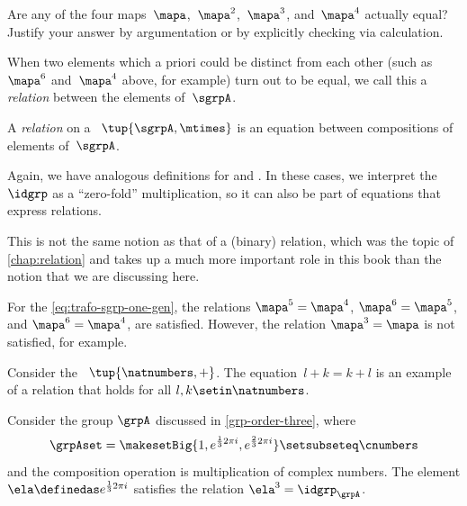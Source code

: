 \begin{gradedexercise}
    \label{ex:CheckRelations}
    Are any of the four maps~$\mapa$,~$\mapa^2$,~$\mapa^3$, and~$\mapa^4$ actually equal?
    Justify your answer by argumentation or by explicitly checking via calculation.
\end{gradedexercise}

When two elements which a priori could be distinct from each other (such as~$\mapa^6$ and~$\mapa^4$ above, for example) turn out to be equal, we call this a \emph{relation} between the elements of~$\sgrpA$.

\begin{ctdefinition}\label{def:relation-on-semigroup}
    A \emph{relation} on a ~$\tup{\sgrpA, \mtimes}$ is an equation between compositions of elements of~$\sgrpA$.
\end{ctdefinition}

\begin{remark}
    Again, we have analogous definitions for  and .
    In these cases, we interpret the  $\idgrp$ as a ``zero-fold'' multiplication, so it can also be part of equations that express relations.
\end{remark}

\begin{remark}
    This is not the same notion as that of a (binary) relation, which was the topic of \cref{chap:relation} and takes up a much more important role in this book than the notion that we are discussing here.
\end{remark}

\begin{example}
    For the  \cref{eq:trafo-sgrp-one-gen}, the relations $\mapa^5 = \mapa^4$, $\mapa^6 = \mapa^5$, and $\mapa^6 = \mapa^4$, \etc are satisfied.
    However, the relation $\mapa^3 = \mapa$ is not satisfied, for example.

\end{example}

\begin{example}
    Consider the ~$\tup{\natnumbers, +}$.
    The equation~$l + k = k + l$ is an example of a relation that holds for all $l, k \setin \natnumbers$.
\end{example}

\begin{example}
    Consider the group $\grpA$ discussed in \cref{grp-order-three}, where
    \begin{equation}
        \grpAset = \makesetBig{ 1, e^{\frac{1}{3}2\pi i}, e^{\frac{2 }{3}2\pi i} } \setsubseteq \cnumbers
    \end{equation}
    and the composition operation is multiplication of complex numbers.
    The element $\ela \definedas e^{\frac{1}{3}2\pi i}$ satisfies the relation $\ela^3 = \idgrp_\grpA$.
\end{example}

